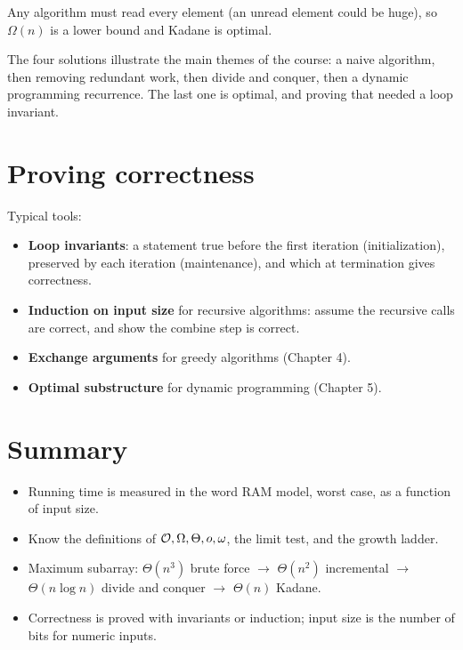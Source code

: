 Any algorithm must read every element (an unread element could be huge), so $\Omega(n)$
is a lower bound and Kadane is optimal.

\begin{important}[Lesson]
The four solutions illustrate the main themes of the course: a naive algorithm,
then removing redundant work, then divide and conquer, then a dynamic programming
recurrence. The last one is optimal, and proving that needed a loop invariant.
\end{important}

\section{Proving correctness}
Typical tools:
\begin{itemize}
  \item \textbf{Loop invariants}: a statement true before the first iteration (initialization),
        preserved by each iteration (maintenance), and which at termination gives correctness.
  \item \textbf{Induction on input size} for recursive algorithms: assume the recursive calls are
        correct, and show the combine step is correct.
  \item \textbf{Exchange arguments} for greedy algorithms (Chapter 4).
  \item \textbf{Optimal substructure} for dynamic programming (Chapter 5).
\end{itemize}

\section*{Summary}
\begin{itemize}
  \item Running time is measured in the word RAM model, worst case, as a function of input size.
  \item Know the definitions of $\mathcal{O},\Omega,\Theta,o,\omega$, the limit test, and the growth ladder.
  \item Maximum subarray: $\Theta(n^3)$ brute force $\to$ $\Theta(n^2)$ incremental $\to$
        $\Theta(n\log n)$ divide and conquer $\to$ $\Theta(n)$ Kadane.
  \item Correctness is proved with invariants or induction; input size is the number of bits for numeric inputs.
\end{itemize}

